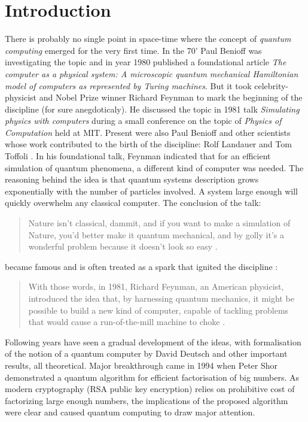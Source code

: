 \chapter*{Introduction}
There is probably no single point in space-time where the concept of \textit{quantum computing} emerged for the very first time. In the 70' Paul Benioff was investigating the topic and in year 1980 published a foundational article \textit{The computer as a physical system: A microscopic quantum mechanical Hamiltonian model of computers as represented by Turing machines}\cite{benioff_computer_1980}. But it took celebrity-physicist and Nobel Prize winner Richard Feynman to mark the beginning of the discipline (for sure anegdoticaly). He discussed the topic in 1981 talk \textit{Simulating physics with computers} during a small conference on the topic of \textit{Physics of Computation} held at MIT. Present were also Paul Benioff and other scientists whose work contributed to the birth of the discipline: Rolf Landauer and Tom Toffoli \cite{mit_endicott_house_physics_2018}. In his foundational talk, Feynman indicated that for an efficient simulation of quantum phenomena, a different kind of computer was needed. The reasoning behind the idea is that quantum systems description grows exponentially with the number of particles involved. A system large enough will quickly overwhelm any classical computer. The conclusion of the talk:
\begin{quote}
Nature isn't classical, dammit, and if you want to make a simulation of Nature, you'd better make it quantum mechanical, and by golly it's a wonderful problem because it doesn't look so easy \cite{feynman_simulating_1982}.
\end{quote}
became famous and is often treated as a spark that ignited the discipline \cite{john_preskill_feynman_2017}\cite{trabesinger_quantum_2012}\cite{the_quantum_insider_global_2021}:
\begin{quote}
With those words, in 1981, Richard Feynman, an American physicist, introduced the idea that, by harnessing quantum mechanics, it might be possible to build a new kind of computer, capable of tackling problems that would cause a run-of-the-mill machine to choke \cite{the_economist_google_2019}.
\end{quote}
Following years have seen a gradual development of the ideas, with formalisation of the notion of a quantum computer by David Deutsch\cite{david_deutsch_quantum_1985} and other important results, all theoretical. Major breakthrough came in 1994 when Peter Shor demonstrated a quantum algorithm for efficient factorisation of big numbers. As modern cryptography (RSA public key encryption) relies on prohibitive cost of factorizing large enough numbers, the implications of the proposed algorithm were clear and caused quantum computing to draw major attention.
